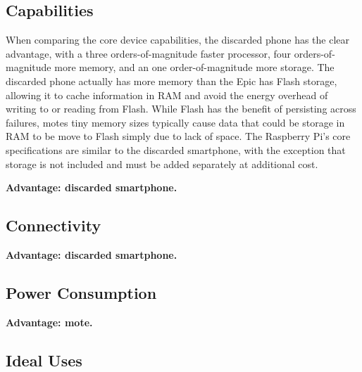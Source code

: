 \subsection{Capabilities}

When comparing the core device capabilities, the discarded phone has the
clear advantage, with a three orders-of-magnitude faster processor, four
orders-of-magnitude more memory, and an one order-of-magnitude more storage.
The discarded phone actually has more memory than the Epic has Flash storage,
allowing it to cache information in RAM and avoid the energy overhead of
writing to or reading from Flash. While Flash has the benefit of persisting
across failures, motes tiny memory sizes typically cause data that could be
storage in RAM to be move to Flash simply due to lack of space. The Raspberry
Pi's core specifications are similar to the discarded smartphone, with the
exception that storage is not included and must be added separately at
additional cost.

\textbf{Advantage: discarded smartphone.}

\subsection{Connectivity}

\textbf{Advantage: discarded smartphone.}

\subsection{Power Consumption}

\textbf{Advantage: mote.}

\subsection{Ideal Uses}

